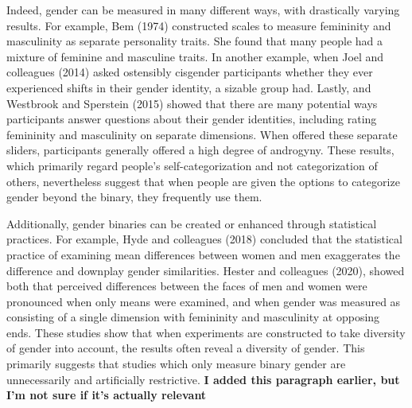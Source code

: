 \documentclass[
  man]{apa7}
\begin{document}
Indeed, gender can be measured in many different ways, with drastically varying results. For example, Bem (1974) constructed scales to measure femininity and masculinity as separate personality traits. She found that many people had a mixture of feminine and masculine traits. In another example, when Joel and colleagues (2014) asked ostensibly cisgender participants whether they ever experienced shifts in their gender identity, a sizable group had. Lastly, and Westbrook and Sperstein (2015) showed that there are many potential ways participants answer questions about their gender identities, including rating femininity and masculinity on separate dimensions. When offered these separate sliders, participants generally offered a high degree of androgyny. These results, which primarily regard people's self-categorization and not categorization of others, nevertheless suggest that when people are given the options to categorize gender beyond the binary, they frequently use them.

Additionally, gender binaries can be created or enhanced through statistical practices. For example, Hyde and colleagues (2018) concluded that the statistical practice of examining mean differences between women and men exaggerates the difference and downplay gender similarities. Hester and colleagues (2020), showed both that perceived differences between the faces of men and women were pronounced when only means were examined, and when gender was measured as consisting of a single dimension with femininity and masculinity at opposing ends. These studies show that when experiments are constructed to take diversity of gender into account, the results often reveal a diversity of gender. This primarily suggests that studies which only measure binary gender are unnecessarily and artificially restrictive. \textbf{I added this paragraph earlier, but I'm not sure if it's actually relevant}
\end{document}
